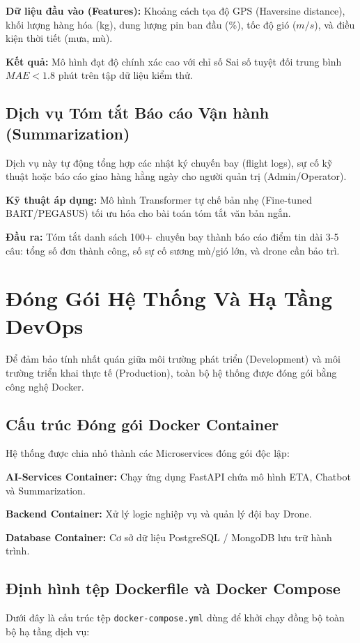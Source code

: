 \textbf{Dữ liệu đầu vào (Features):} Khoảng cách tọa độ GPS (Haversine distance), khối lượng hàng hóa (kg), dung lượng pin ban đầu (\%), tốc độ gió ($m/s$), và điều kiện thời tiết (mưa, mù).

\textbf{Kết quả:} Mô hình đạt độ chính xác cao với chỉ số Sai số tuyệt đối trung bình $MAE < 1.8$ phút trên tập dữ liệu kiểm thử.

\subsection{Dịch vụ Tóm tắt Báo cáo Vận hành (Summarization)}
Dịch vụ này tự động tổng hợp các nhật ký chuyến bay (flight logs), sự cố kỹ thuật hoặc báo cáo giao hàng hằng ngày cho người quản trị (Admin/Operator).

\textbf{Kỹ thuật áp dụng:} Mô hình Transformer tự chế bản nhẹ (Fine-tuned BART/PEGASUS) tối ưu hóa cho bài toán tóm tắt văn bản ngắn.

\textbf{Đầu ra:} Tóm tắt danh sách 100+ chuyến bay thành báo cáo điểm tin dài 3-5 câu: tổng số đơn thành công, số sự cố sương mù/gió lớn, và drone cần bảo trì.

\section{Đóng Gói Hệ Thống Và Hạ Tầng DevOps}

Để đảm bảo tính nhất quán giữa môi trường phát triển (Development) và môi trường triển khai thực tế (Production), toàn bộ hệ thống được đóng gói bằng công nghệ Docker.

\subsection{Cấu trúc Đóng gói Docker Container}
Hệ thống được chia nhỏ thành các Microservices đóng gói độc lập:

\textbf{AI-Services Container:} Chạy ứng dụng FastAPI chứa mô hình ETA, Chatbot và Summarization.

\textbf{Backend Container:} Xử lý logic nghiệp vụ và quản lý đội bay Drone.

\textbf{Database Container:} Cơ sở dữ liệu PostgreSQL / MongoDB lưu trữ hành trình.

\subsection{Định hình tệp Dockerfile và Docker Compose}
Dưới đây là cấu trúc tệp \texttt{docker-compose.yml} dùng để khởi chạy đồng bộ toàn bộ hạ tầng dịch vụ:

